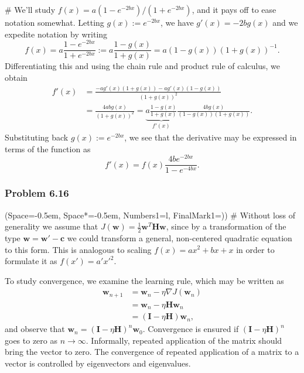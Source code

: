 \documentclass[12pt, a4paper]{article}
\newcommand{\listSpace}{-0.5em}%
\newcommand{\vect}[1]{\bm{#1}}
\begin{document}
{\begin{easylist}[enumerate]
	# We'll study $f(x) = a (1 - e^{-2bx}) / (1 + e^{-2bx})$, and it pays off to ease notation somewhat.
	Letting $g(x) := e^{-2bx}$, we have $g'(x) = -2b g(x)$ and we expedite notation by writing
	\begin{equation*}
		f(x) = a \frac{1 - e^{-2bx}}{1 + e^{-2bx}} :=
		a \frac{1 - g(x)}{1 + g(x)} =  a (1 - g(x)) (1 + g(x))^{-1}.
	\end{equation*}
	Differentiating this and using the chain rule and product rule of calculus, we obtain
	\begin{align*}
		f'(x) &=  \frac{-a g'(x) (1 + g(x)) - ag'(x) (1 - g(x))}{(1 + g(x))^2} \\
		&= \frac{4 ab g(x)}{(1 + g(x))^2} = \underbrace{a \frac{1 - g(x)}{1 + g(x)}}_{f'(x)} \frac{4bg(x)}{(1 - g(x)) (1 + g(x))}.
	\end{align*}
	Substituting back $g(x) := e^{-2bx}$, we see that  the derivative may be expressed in terms of the function as
	\begin{equation*}
		f'(x) = f(x) \frac{4 b  e^{-2bx}}{1 - e^{-4bx}}.
	\end{equation*}
\end{easylist}


\subsubsection*{Problem 6.16}
\begin{easylist}[enumerate]
\ListProperties(Space=\listSpace, Space*=\listSpace, Numbers1=l, FinalMark1={)})
# Without loss of generality we assume that $J(\vect{w}) = \frac{1}{2}\vect{w}^T \vect{H} \vect{w}$, since by a transformation of the type $\vect{w} = \vect{w}' - \vect{c}$ we could transform a general, non-centered quadratic equation to this form.
This is analogous to scaling $f(x) = a x^2 + bx + x$ in order to formulate it as $f(x') = a' x'^2$.

To study convergence, we examine the learning rule, which may be written as
\begin{align*}
	\vect{w}_{n+1} &= \vect{w}_{n} - \eta \nabla J(\vect{w}_{n}) \\
	&= \vect{w}_{n} - \eta  \vect{H} \vect{w}_{n} \\
	&=  \left( \vect{I} - \eta  \vect{H} \right) \vect{w}_{n},
\end{align*}
and observe that $\vect{w}_{n} = \left( \vect{I} - \eta  \vect{H} \right)^n \vect{w}_{0}$.
Convergence is ensured if $\left( \vect{I} - \eta  \vect{H} \right)^n$ goes to zero as $n \to \infty$.
Informally, repeated application of the matrix should bring the vector to zero.
The convergence of repeated application of a matrix to a vector is controlled by eigenvectors and eigenvalues.


\end{easylist}}
\end{document}
